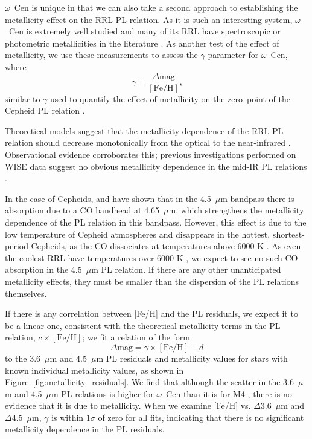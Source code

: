 \documentclass[a4paper,fleqn,usenatbib]{mnras}
\begin{document}
$\omega$~Cen is unique in that we can also take a second approach to establishing the metallicity effect on the RRL PL relation. As it is such an interesting system, $\omega$~Cen is extremely well studied and many of its RRL have spectroscopic or photometric metallicities in the literature \citep[e.g.][]{2006ApJ...640L..43S, 2000AJ....119.1824R}. As another test of the effect of metallicity, we use these measurements to assess the $\gamma$ parameter for $\omega$~Cen, where 
\begin{equation} \label{eqn:gamma}
\gamma = \dfrac {\Delta \text{mag}} {[\text{Fe/H}]}\text{,}
\end{equation}
similar to $\gamma$ used to quantify the effect of metallicity on the zero--point of the Cepheid PL relation \citep{1998ApJ...498..181K}. 

Theoretical models suggest that the metallicity dependence of the RRL PL relation should decrease monotonically from the optical to the near-infrared \citep{2001MNRAS.326.1183B, 2004ApJS..154..633C}. Observational evidence corroborates this; previous investigations performed on WISE data suggest no obvious metallicity dependence in the mid-IR PL relations \citep{2013ApJ...776..135M}.

In the case of Cepheids, \citet{2011ApJ...743...76S} and \citet{2015arXiv150206995S} have shown that in the 4.5~$\mu$m bandpass there is absorption due to a CO bandhead at 4.65~$\mu$m, which strengthens the metallicity dependence of the PL relation in this bandpass. However, this effect is due to the low temperature of Cepheid atmospheres and disappears in the hottest, shortest-period Cepheids, as the CO dissociates at temperatures above 6000 K \citep{2012ApJ...759..146M}. As even the coolest RRL have temperatures over 6000 K \citep{1971PASP...83..697I}, we expect to see no such CO absorption in the 4.5~$\mu$m PL relation. If there are any other unanticipated metallicity effects, they must be smaller than the dispersion of the PL relations themselves.

If there is any correlation between [Fe/H] and the PL residuals, we expect it to be a linear one, consistent with the theoretical metallicity terms in the PL relation, $c\times[\text{Fe/H}]$; we fit a relation of the form
\begin{equation}
\Delta\text{mag} = \gamma \times[\text{Fe/H}] + d
\end{equation}
to the 3.6~$\mu$m and 4.5~$\mu$m PL residuals and metallicity values for stars with known individual metallicity values, as shown in Figure~\ref{fig:metallicity_residuals}. We find that although the scatter in the 3.6~$\mu$m and 4.5~$\mu$m PL relations is higher for $\omega$~Cen than it is for M4 \citep{2015arXiv150507858N, 2015ApJ...799..165B}, there is no evidence that it is due to metallicity. When we examine [Fe/H] vs. $\Delta$3.6~$\mu$m and $\Delta$4.5~$\mu$m, $\gamma$ is within $1\sigma$ of zero for all fits, indicating that there is no significant metallicity dependence in the PL residuals.
\end{document}
